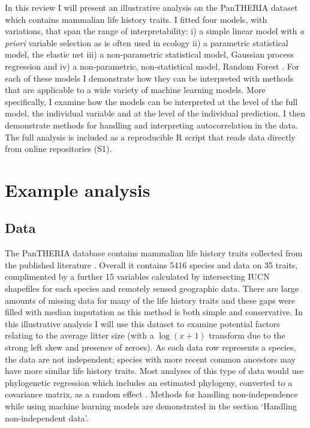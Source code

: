 \documentclass[12pt,]{article}
\begin{document}
In this review I will present an illustrative analysis on the PanTHERIA dataset \citep{jones2009pantheria} which contains mammalian life history traits.
I fitted four models, with variations, that span the range of interpretability: i) a simple linear model with \emph{a priori} variable selection as is often used in ecology ii) a parametric statistical model, the elastic net \citep{elasticnet} iii) a non-parametric statistical model, Gaussian process regression \citep{rasmussen2004gaussian} and iv) a non-parametric, non-statistical model, Random Forest \citep{breiman2001random}.
For each of these models I demonstrate how they can be interpreted with methods that are applicable to a wide variety of machine learning models.
More specifically, I examine how the models can be interpreted at the level of the full model, the individual variable and at the level of the individual prediction.
I then demonstrate methods for handling and interpreting autocorrelation in the data.
The full analysis is included as a reproducible R \citep{R} script that reads data directly from online repositories (S1).

\section{Example analysis}\label{example-analysis}

\subsection{Data}\label{data}

The PanTHERIA database contains mammalian life history traits collected from the published literature \citep{jones2009pantheria}.
Overall it contains 5416 species and data on 35 traits, complimented by a further 15 variables calculated by intersecting IUCN shapefiles for each species and remotely sensed geographic data.
There are large amounts of missing data for many of the life history traits and these gaps were filled with median imputation as this method is both simple and conservative.
In this illustrative analysis I will use  this dataset to examine potential factors relating to the average litter size (with a \(\log(x+1)\) transform due to the strong left skew and presence of zeroes).
As each data row represents a species, the data are not independent; species with more recent common ancestors may have more similar life history traits.
Most analyses of this type of data \citep{felsenstein1985phylogenies, ives2006statistics, gay2014parasite, pellissier2012shifts, ferguson2014colony} would use phylogenetic regression which includes an estimated phylogeny, converted to a covariance matrix, as a random effect \citep{magnusson2017glmmtmb, caper}.
Methods for handling non-independence while using machine learning models are demonstrated in the section `Handling non-independent data'.
\end{document}
